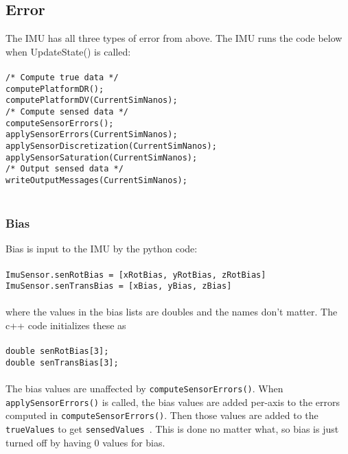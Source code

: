 \documentclass[]{BasiliskReportMemo}
\begin{document}
\subsection{Error}
The IMU has all three types of error from above. The IMU runs the code below when UpdateState() is called:\\\\
\verb|/* Compute true data */|\\
\verb|computePlatformDR();|\\
\verb|computePlatformDV(CurrentSimNanos);|\\
\verb|/* Compute sensed data */|\\
\verb|computeSensorErrors();|\\
\verb|applySensorErrors(CurrentSimNanos);|\\
\verb|applySensorDiscretization(CurrentSimNanos);|\\
\verb|applySensorSaturation(CurrentSimNanos);|\\
\verb|/* Output sensed data */|\\
\verb|writeOutputMessages(CurrentSimNanos);|\\\\

\subsubsection{Bias}
Bias is input to the IMU by the python code:\\\\
\verb|ImuSensor.senRotBias = [xRotBias, yRotBias, zRotBias]|\\
\verb|ImuSensor.senTransBias = [xBias, yBias, zBias]|\\\\
where the values in the bias lists are doubles and the names don't matter.
The c++ code initializes these as \\\\
\verb|double senRotBias[3]; |\\
\verb|double senTransBias[3]; |\\\\
The bias values are unaffected by \verb|computeSensorErrors()|. When  \verb|applySensorErrors()| is called, the bias values are added per-axis to the errors computed in \verb|computeSensorErrors()|. Then those values are added to the \verb|trueValues| to get \verb|sensedValues |. This is done no matter what, so bias is just turned off by having 0 values for bias.
\end{document}
